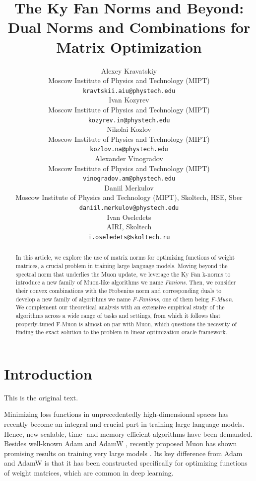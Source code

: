 \documentclass{article} %
\title{The Ky Fan Norms and Beyond: Dual Norms and Combinations for Matrix Optimization}
\author{Alexey Kravatskiy \\
Moscow Institute of Physics and Technology (MIPT) \\
\texttt{kravtskii.aiu@phystech.edu} \\
\And
Ivan Kozyrev \\
Moscow Institute of Physics and Technology (MIPT) \\
\texttt{kozyrev.in@phystech.edu} \\
\And
Nikolai Kozlov \\
Moscow Institute of Physics and Technology (MIPT) \\
\texttt{kozlov.na@phystech.edu} \\
\And
Alexander Vinogradov \\
Moscow Institute of Physics and Technology (MIPT) \\
\texttt{vinogradov.am@phystech.edu} \\
\And
Daniil Merkulov \\
Moscow Institute of Physics and Technology (MIPT), Skoltech, HSE, Sber \\
\texttt{daniil.merkulov@phystech.edu} \\
\And
Ivan Oseledets \\
AIRI, Skoltech \\
\texttt{i.oseledets@skoltech.ru}
}
\begin{document}
\maketitle

\begin{abstract}

In this article, we explore the use of matrix norms for optimizing functions of weight matrices, a crucial problem in training large language models. Moving beyond the spectral norm that underlies the Muon update, we leverage the Ky Fan k-norms to introduce a new family of Muon-like algorithms we name {\it Fanions}. Then, we consider their convex combinations with the Frobenius norm and corresponding duals to develop a new family of algorithms we name {\it F-Fanions}, one of them being {\it F-Muon}. We complement our theoretical analysis with an extensive empirical study of the algorithms across a wide range of tasks and settings, from which it follows that properly-tuned F-Muon is almost on par with Muon, which questions the necessity of finding the exact solution to the problem in linear optimization oracle framework.


\end{abstract}

\section{Introduction}
This is the original text. 

 Minimizing loss functions in unprecedentedly high-dimensional spaces has recently become an integral and crucial part in training large language models. Hence, new scalable, time- and memory-efficient algorithms have been demanded. Besides well-known Adam \citep{kingma2014adam} and AdamW \citep{loshchilov2017decoupled}, recently proposed Muon \citep{jordan2024muon} has shown promising results on training very large models \citep{liu2025muon}. Its key difference from Adam and AdamW is that it has been constructed specifically for optimizing functions of weight matrices, which are common in deep learning.
 
\end{document}
